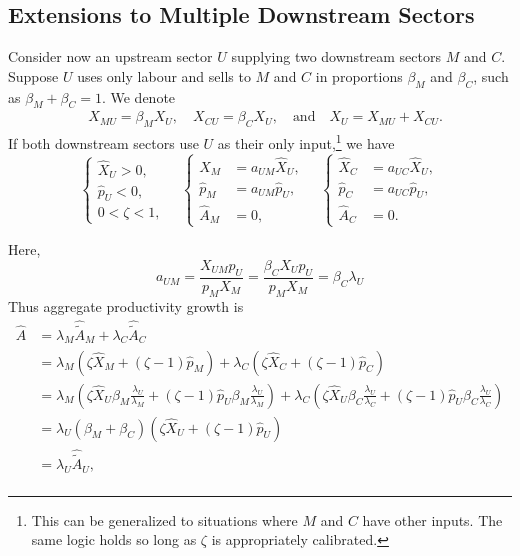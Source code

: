 \documentclass[11pt]{article}
\begin{document}
\subsection{Extensions to Multiple Downstream Sectors}
Consider now an upstream sector $U$ supplying two downstream sectors $M$ and $C$. Suppose $U$ uses only labour and sells to $M$ and $C$ in proportions $\beta_M$ and $\beta_C$, such as $\beta_M + \beta_C = 1$. We denote
\[
\begin{aligned}
    &X_{MU} = \beta_M X_U, 
    \quad 
    X_{CU} = \beta_C X_U, 
    \quad \text{and}  \quad 
    X_U = X_{MU} + X_{CU}.
\end{aligned}
\]
If both downstream sectors use $U$ as their only input,\footnote{
%
This can be generalized to situations where $M$ and $C$ have other inputs. The same logic holds so long as $\zeta$ is appropriately calibrated. 
%
} we have
\[
\begin{cases}
\hat{X}_U>0,\\
\hat{p}_U<0,\\
0<\zeta<1,
\end{cases}
\quad
\begin{cases}
\hat{X}_M&=a_{UM}\hat{X}_U,\\
\hat{p}_M&=a_{UM}\hat{p}_U,\\
\hat{A}_M&=0,
\end{cases}
\quad
\begin{cases}
\hat{X}_C&=a_{UC}\hat{X}_U,\\
\hat{p}_C&=a_{UC}\hat{p}_U,\\
\hat{A}_C&=0.
\end{cases}
\]

Here, 
\begin{equation*}
    a_{UM}=\frac{X_{UM}p_U}{p_MX_M}=\frac{\beta_CX_Up_U}{p_MX_M}=\beta_C\lambda_U
\end{equation*}
Thus aggregate productivity growth is
\begin{equation}
\begin{aligned}
    \hat{A}&=\lambda_M \hat{\tilde{A}}_M+\lambda_C \hat{\tilde{A}}_C\\
    &= \lambda_M \left(\zeta\hat{X}_M+(\zeta-1)\hat{p}_M\right)+
    \lambda_C \left(\zeta\hat{X}_C+(\zeta-1)\hat{p}_C\right)\\
    &=\lambda_M \left(\zeta\hat{X}_U\beta_M\frac{\lambda_U}{\lambda_M}+(\zeta-1)\hat{p}_U\beta_M\frac{\lambda_U}{\lambda_M}\right)+
    \lambda_C \left(\zeta\hat{X}_U\beta_C\frac{\lambda_U}{\lambda_C}+(\zeta-1)\hat{p}_U\beta_C\frac{\lambda_U}{\lambda_C}\right)\\
     &=\lambda_U(\beta_M+\beta_C) \left(\zeta\hat{X}_U+(\zeta-1)\hat{p}_U\right)\\
     &=\lambda_U \hat{\tilde{A}}_U,\\
\end{aligned}
\end{equation}
\end{document}
